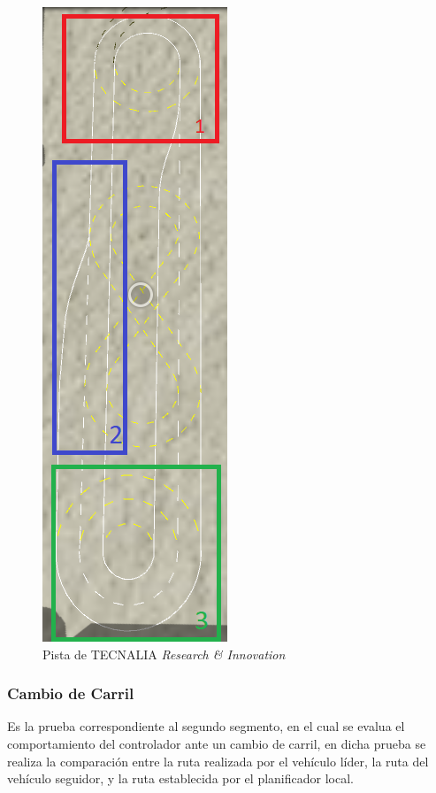 \begin{figure}[!h]
	\centering
		\includegraphics[scale=0.35]{Imagenes/tecnaliap2}
		\caption{Pista de TECNALIA \textit{Research \& Innovation}}
		\label{fig:tecnaliap2}
\end{figure}	 

\subsubsection{Cambio de Carril}
Es la prueba correspondiente al segundo segmento, en el cual se evalua el comportamiento del controlador ante un cambio de carril, en dicha prueba se realiza la comparación entre la ruta realizada por el vehículo líder, la ruta del vehículo seguidor, y la ruta establecida por el planificador local. 


